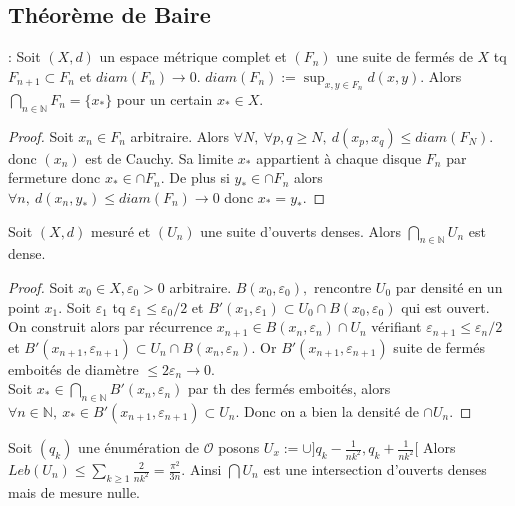 \subsection{Théorème de Baire}
\begin{lemme} : Soit $(X,d)$ un espace métrique complet et $(F_n)$ une suite de fermés de $X$ tq $F_{n+1}\subset F_n$ et $diam(F_n)\to 0.$ $diam(F_n):=\sup_{x,y\in F_n}d(x,y)$. Alors $\bigcap\limits_{n\in \mathbb{N} } F_n=\{x_*\} $ pour un certain $x_*\in X.$
\end{lemme}
\begin{proof}
    Soit $x_{n}\in F_n$ arbitraire. Alors $\forall N,\ \forall p,q\ge N,\ d(x_p,x_q)\le diam(F_N).  $ donc $(x_{n})$ est de Cauchy. Sa limite $x_*$ appartient à chaque disque $F_n$ par fermeture donc $x_*\in \cap F_n.$ De plus si $y_*\in \cap F_n$ alors $\forall n,\ d(x_{n},y_*)\le diam(F_n)\to 0 $ donc $x_*=y_*$.
\end{proof}
\begin{theoreme}[Baire]

    Soit $(X,d)$ mesuré et $(U_n)$ une suite d'ouverts denses. Alors $\bigcap\limits_{n\in \mathbb{N} } U_n$ est dense.
\end{theoreme}
\begin{proof}
    Soit $x_0\in X, \varepsilon _0 >0$ arbitraire. $B(x_0,\varepsilon _0),$ rencontre $U_0$ par densité en un point $x_1.$ Soit $\varepsilon _1$ tq $\varepsilon _1\le \varepsilon _0 /2$ et $B'(x_1,\varepsilon _1)\subset U_0\cap B(x_0,\varepsilon _0)$ qui est ouvert.\\
    On construit alors par récurrence $x_{n+1}\in B(x_n,\varepsilon _n)\cap U_n$ vérifiant $\varepsilon _{n+1}\le \varepsilon _n /2$ et $B'(x_{n+1},\varepsilon _{n+1})\subset U_n\cap B(x_{n},\varepsilon _n)$. Or $B'(x_{n+1},\varepsilon _{n+1})$ suite de fermés emboités de diamètre $\le 2\varepsilon _n\to 0$.\\
    Soit $x_*\in \bigcap\limits_{n\in \mathbb{N} } B'(x_n,\varepsilon _n)$ par th des fermés emboités, alors $\forall n\in \mathbb{N} ,\ x_*\in B'(x_{n+1},\varepsilon _{n+1})\subset U_n $. Donc on a bien la densité de $\cap U_n$.
\end{proof}
\begin{ex}
    Soit $(q_k)$ une énumération de $\mathcal{O}$ posons $U_x:=\cup ]q_k-\frac{1}{nk^2},q_k+\frac{1}{nk^2}[$ Alors $Leb(U_n)\le \sum\limits_{k\ge 1}^{} \frac{2}{nk^2}=\frac{\pi^2}{3n}$. Ainsi $\bigcap U_n$ est une intersection d'ouverts denses mais de mesure nulle.
\end{ex}

